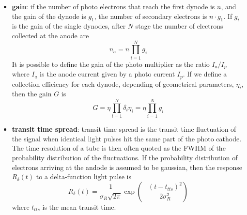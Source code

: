 \begin{itemize}
\item \textbf{gain}: if the number of photo electrons that reach the first dynode is $n$, and the gain of the dynode is $g_{1}$, the number of secondary electrons is $n\cdot g_{1}$. If $g_{i}$ is the gain of the single dynodes, after $N$ stage the number of electrons collected at the anode are
\begin{equation}
n_{a} = n\prod_{i=1}^N g_i
\end{equation}
It is possible to define the gain of the photo multiplier as the ratio $I_{a}/I_{p}$ where $I_{a}$ is the anode current given by a photo current $I_{p}$. If we define a collection efficiency for each dynode, depending of geometrical parameters, $\eta _{i}$, then the gain $G$ is
\begin{equation}
G = \eta \prod_{i=1}^N \delta _{i} \eta _{i} = \eta \prod_{i=1}^N g_{i}
\end{equation}
\item \textbf{transit time spread}: transit time spread is the transit-time fluctuation of the signal when identical light pulses hit the same part of the photo cathode. The time resolution of a tube is then often quoted as the FWHM of the probability distribution of the fluctuations.
If the probability distribution of electrons arriving at the andode is assumed to be gaussian, then the response $R_{\delta}(t)$ to a delta-function light pulse is
\begin{equation}
R_{\delta}(t) = \frac{1}{\sigma _{R}\sqrt {2\pi}}\exp{\left( -\frac{(t-t_{tts})^2}{2\sigma _{R}^2}\right)}
\end{equation}
where $t_{tts}$ is the mean transit time.
\end{itemize}

